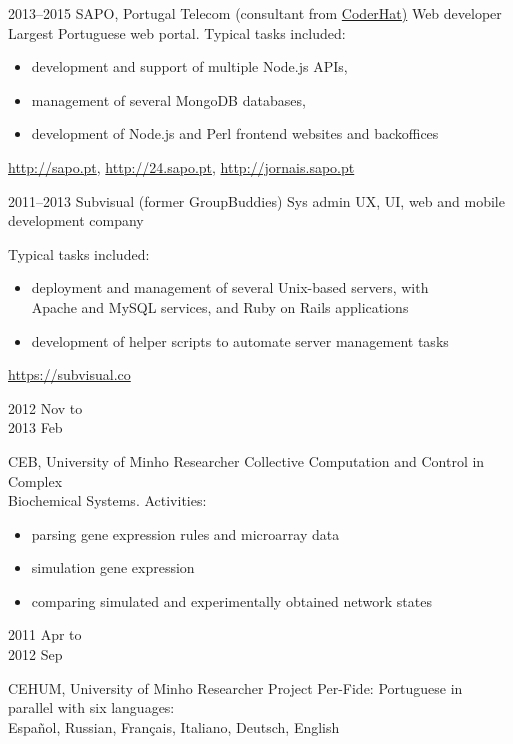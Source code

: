 \documentclass[a4paper]{friggeri-cv}
\begin{document}
\begin{entrylist}
  \entry
    {2013--2015}
    {SAPO, Portugal Telecom (consultant from \href{http://www.coderhat.com/}{CoderHat)}}
    {Web developer}
    {Largest Portuguese web portal. \footnotesize{Typical tasks
    included:}}
    {\begin{itemize}
        \item development and support of multiple Node.js APIs,
        \item management of several MongoDB databases,
        \item development of Node.js and Perl frontend websites and backoffices
    \end{itemize}
    \url{http://sapo.pt}, \url{http://24.sapo.pt}, \url{http://jornais.sapo.pt}
    }
  \entry
    {2011--2013}
    {Subvisual (former GroupBuddies)}
    {Sys admin}
    {UX, UI, web and mobile development company}
    {Typical tasks included:
        \begin{itemize}
            \item deployment and management of several Unix-based
            servers, with\\
            Apache and MySQL services, and Ruby on Rails applications
            \item development of helper scripts to automate
            server management tasks
            \end{itemize}
        \url{https://subvisual.co}
    }
  \entry
    {\parbox[t][][t]{1.8cm}{2012 {\footnotesize Nov to}\\2013 {\footnotesize Feb}}}
    {CEB, University of Minho}
    {Researcher}
    {Collective Computation and Control in Complex\\
    Biochemical Systems. {\footnotesize Activities:}}
    {
        \begin{itemize}
            \item parsing gene expression rules and microarray data
            \item simulation gene expression
            \item comparing simulated and experimentally obtained
                network states
        \end{itemize}
    }
  \entry
    {\parbox[t][][t]{1.8cm}{2011 {\footnotesize Apr to}\\2012 {\footnotesize Sep}}}
    {CEHUM, University of Minho}
    {Researcher}
    {Project Per-Fide: Portuguese in parallel with six languages:\\
    Español, Russian, Français, Italiano, Deutsch, English}

\end{entrylist}
\end{document}
